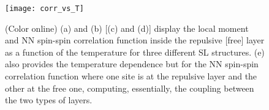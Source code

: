 \documentclass[aps,pra,reprint,twocolumn,showpacs,longbibliography,superscriptaddress]{revtex4-1}
\begin{document}
\begin{figure}[!tb] %
  \texttt{[image: corr\_vs\_T]}
 \caption{(Color online) (a) and (b) [(c) and (d)] display the local moment and NN spin-spin correlation function inside the repulsive [free] layer as a function of the temperature for three different SL structures. (e) also provides the temperature dependence but for the NN spin-spin correlation function where one site is at the repulsive layer and the other at the free one, computing, essentially, the coupling between the two types of layers.}
 \label{fig:corr_vs_T}
\end{figure}






\end{document}
